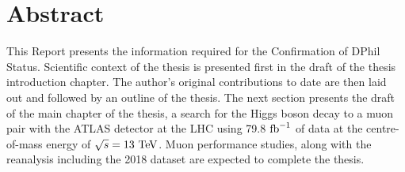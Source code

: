 \chapter*{Abstract}
This Report presents the information required for the Confirmation of DPhil Status.
Scientific context of the thesis is presented first in the draft of the thesis
introduction chapter. The author’s original contributions to date are then laid
out and followed by an outline of the thesis. The next section presents the draft
of the main chapter of the thesis, a search for the Higgs boson decay to a muon
pair with the ATLAS detector at the LHC using 79.8 $\text{fb}^{-1}$ of data at the centre-of-mass
energy of $\sqrt{s} = 13~\text{Te\kern -0.1em V}$. Muon performance studies, along with the reanalysis including
the 2018 dataset are expected to complete the thesis.
